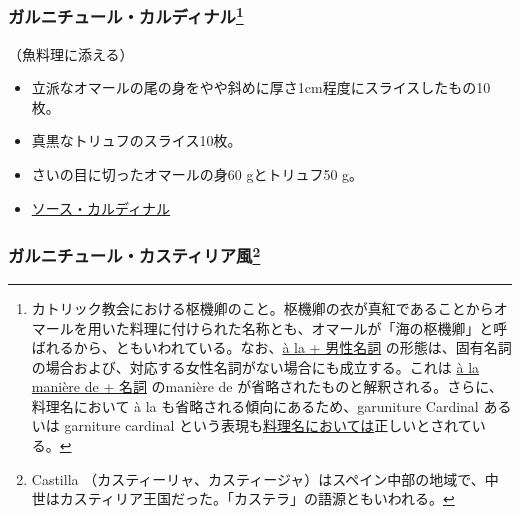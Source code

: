 \begin{recette}
\hypertarget{garniture-cardinal}{%
\subsubsection[ガルニチュール・カルディナル]{\texorpdfstring{ガルニチュール・カルディナル\footnote{カトリック教会における枢機卿のこと。枢機卿の衣が真紅であることからオマールを用いた料理に付けられた名称とも、オマールが「海の枢機卿」と呼ばれるから、ともいわれている。なお、\ul{à la + 男性名詞}
  の形態は、固有名詞の場合および、対応する女性名詞がない場合にも成立する。これは
  \ul{à la manière de + 名詞} のmanière de
  が省略されたものと解釈される。さらに、料理名において à la
  も省略される傾向にあるため、garuniture Cardinal あるいは garniture
  cardinal という表現も\ul{料理名においては}正しいとされている。}}{ガルニチュール・カルディナル}}\label{garniture-cardinal}}



（魚料理に添える）

\begin{itemize}
\item
  立派なオマールの尾の身をやや斜めに厚さ1cm程度にスライスしたもの10枚。
\item
  真黒なトリュフのスライス10枚。
\item
  さいの目に切ったオマールの身60 gとトリュフ50 g。
\item
  \protect\hyperlink{sauce-cardinal}{ソース・カルディナル}
\end{itemize}

\hypertarget{garniture-castillane}{%
\subsubsection[ガルニチュール・カスティリア風]{\texorpdfstring{ガルニチュール・カスティリア風\footnote{Castilla
  （カスティーリャ、カスティージャ）はスペイン中部の地域で、中世はカスティリア王国だった。「カステラ」の語源ともいわれる。}}{ガルニチュール・カスティリア風}}\label{garniture-castillane}}




\end{recette}
